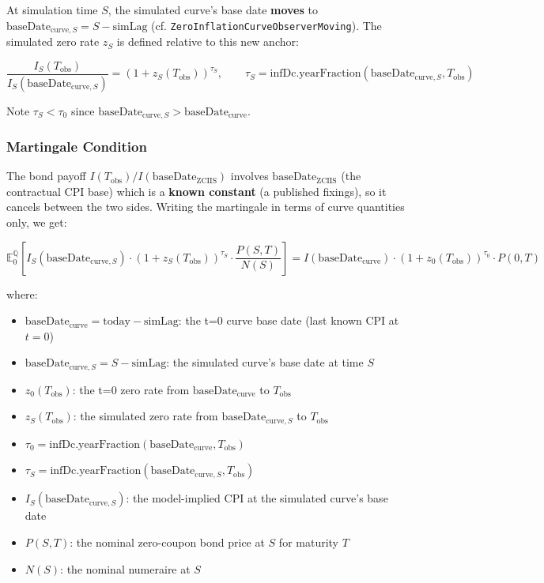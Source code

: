 \documentclass[11pt,a4paper]{article}
\newcommand{\code}[1]{\texttt{#1}}
\begin{document}
At simulation time $S$, the simulated curve's base date \textbf{moves} to $\text{baseDate}_{\text{curve},S} = S - \text{simLag}$ (cf. \code{ZeroInflationCurveObserverMoving}). The simulated zero rate $z_S$ is defined relative to this new anchor:

\begin{equation}
\frac{I_S(T_{\text{obs}})}{I_S(\text{baseDate}_{\text{curve},S})} = (1 + z_S(T_{\text{obs}}))^{\tau_S}, \qquad \tau_S = \text{infDc.yearFraction}(\text{baseDate}_{\text{curve},S}, T_{\text{obs}})
\end{equation}

Note $\tau_S < \tau_0$ since $\text{baseDate}_{\text{curve},S} > \text{baseDate}_{\text{curve}}$.

\subsubsection{Martingale Condition}

The bond payoff $I(T_{\text{obs}}) / I(\text{baseDate}_{\text{ZCIIS}})$ involves $\text{baseDate}_{\text{ZCIIS}}$ (the contractual CPI base) which is a \textbf{known constant} (a published fixings), so it cancels between the two sides. Writing the martingale in terms of curve quantities only, we get:

\begin{equation}
\boxed{\mathbb{E}^{\mathbb{Q}}_0 \left[ I_S(\text{baseDate}_{\text{curve},S}) \cdot (1 + z_S(T_{\text{obs}}))^{\tau_S} \cdot \frac{P(S,T)}{N(S)} \right] = I(\text{baseDate}_{\text{curve}}) \cdot (1 + z_0(T_{\text{obs}}))^{\tau_0} \cdot P(0,T)}
\end{equation}

where:
\begin{itemize}
\item $\text{baseDate}_{\text{curve}} = \text{today} - \text{simLag}$: the t=0 curve base date (last known CPI at $t=0$)
\item $\text{baseDate}_{\text{curve},S} = S - \text{simLag}$: the simulated curve's base date at time $S$
\item $z_0(T_{\text{obs}})$: the t=0 zero rate from $\text{baseDate}_{\text{curve}}$ to $T_{\text{obs}}$
\item $z_S(T_{\text{obs}})$: the simulated zero rate from $\text{baseDate}_{\text{curve},S}$ to $T_{\text{obs}}$
\item $\tau_0 = \text{infDc.yearFraction}(\text{baseDate}_{\text{curve}}, T_{\text{obs}})$
\item $\tau_S = \text{infDc.yearFraction}(\text{baseDate}_{\text{curve},S}, T_{\text{obs}})$
\item $I_S(\text{baseDate}_{\text{curve},S})$: the model-implied CPI at the simulated curve's base date
\item $P(S,T)$: the nominal zero-coupon bond price at $S$ for maturity $T$
\item $N(S)$: the nominal numeraire at $S$
\end{itemize}
\end{document}
